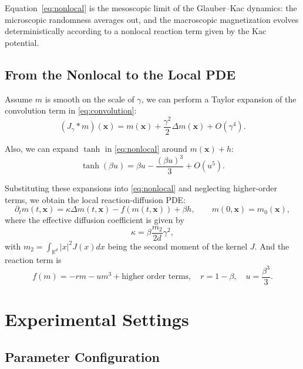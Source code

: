 \documentclass[11pt,a4paper]{article}
\begin{document}
Equation~\eqref{eq:nonlocal} is the mesoscopic limit of the Glauber--Kac dynamics: 
the microscopic randomness averages out, and the macroscopic magnetization evolves deterministically according to a nonlocal reaction term given by the Kac potential.

\subsection{From the Nonlocal to the Local PDE}
Assume $m$ is smooth on the scale of $\gamma$, we can perform a Taylor expansion of the convolution term in \cref{eq:convolution}:
\begin{equation}
    (J_\gamma * m)(\mathbf{x}) = m(\mathbf{x}) + \frac{\gamma^2}{2}\Delta m(\mathbf{x}) + O(\gamma^4).
\end{equation}

Also, we can expand $\tanh$ in \cref{eq:nonlocal} around $m(\mathbf{x}) + h$:
\begin{equation}
    \tanh(\beta u) = \beta u - \frac{(\beta u)^3}{3} + O(u^5).
\end{equation}

Substituting these expansions into \cref{eq:nonlocal} and neglecting higher-order terms, we obtain the local reaction-diffusion PDE:
\begin{equation}\label{eq:local}
    \partial_t m(t,\mathbf{x}) = \kappa \Delta m(t,\mathbf{x}) - f(m(t,\mathbf{x})) + \beta h,
    \qquad m(0,\mathbf{x})=m_0(\mathbf{x}),
\end{equation}
where the effective diffusion coefficient is given by
\begin{equation}
    \kappa = \beta \frac{m_2}{2d} \gamma^2,
\end{equation}
with $m_2 = \int_{\mathbb{R}^d} |x|^2 J(x) dx$ being the second moment of the kernel $J$. And the reaction term is
\begin{equation}
    f(m) = -rm - u m^3 + \text{higher order terms}, \quad r = 1-\beta, \quad u = \frac{\beta^3}{3}.
\end{equation} 


\section{Experimental Settings}

\subsection{Parameter Configuration}
\end{document}
